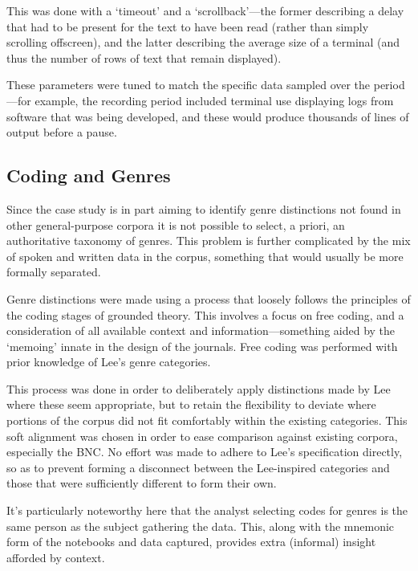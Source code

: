 This was done with a `timeout' and a `scrollback'---the former describing a delay that had to be present for the text to have been read (rather than simply scrolling offscreen), and the latter describing the average size of a terminal (and thus the number of rows of text that remain displayed).

These parameters were tuned to match the specific data sampled over the period---for example, the recording period included terminal use displaying logs from software that was being developed, and these would produce thousands of lines of output before a pause.




\subsection{Coding and Genres}
Since the case study is in part aiming to identify genre distinctions not found in other general-purpose corpora it is not possible to select, a priori, an authoritative taxonomy of genres.  This problem is further complicated by the mix of spoken and written data in the corpus, something that would usually be more formally separated.


Genre distinctions were made using a process that loosely follows the principles of the coding stages of grounded theory\cite{glaser1992emergence}.  
This involves a focus on free coding, and a consideration of all available context and information---something aided by the `memoing' innate in the design of the journals.  Free coding was performed with prior knowledge of Lee's genre categories.


This process was done in order to deliberately apply distinctions made by Lee where these seem appropriate, but to retain the flexibility to deviate where portions of the corpus did not fit comfortably within the existing categories.  This soft alignment was chosen in order to ease comparison against existing corpora, especially the BNC\@.  No effort was made to adhere to Lee's specification directly, so as to prevent forming a disconnect between the Lee-inspired categories and those that were sufficiently different to form their own.

It's particularly noteworthy here that the analyst selecting codes for genres is the same person as the subject gathering the data.  This, along with the mnemonic form of the notebooks and data captured, provides extra (informal) insight afforded by context.



